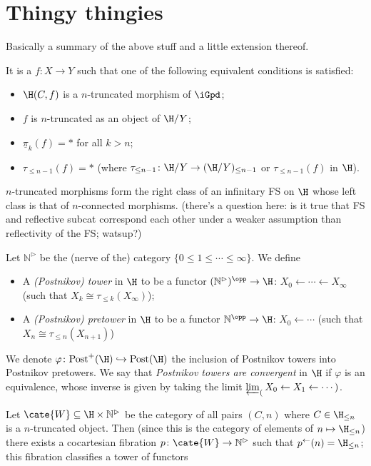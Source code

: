 \section{Thingy thingies}		
Basically a summary of the above stuff and a little extension thereof.		
\begin{definition}		
It is a $f \colon X\to Y$ such that one of the following equivalent conditions is satisfied:		
\begin{itemize}		
	\item $\H(C,f)$ is a $n$-truncated morphism of $\iGpd$;		
	\item $f$ is $n$-truncated as an object of $\H/Y$;		
	\item $\underline{\pi}_k(f) = *$ for all $k>n$;		
	\item $\tau_{\le n-1}(f) = *$ (where $\tau_{\le n-1} \colon \H/Y \to (\H/Y)_{\le n-1}$ or $\tau_{\le n-1}(f)$ in $\H$).		
\end{itemize}		
\end{definition}		
\begin{proposition}		
$n$-truncated morphisms form the right class of an infinitary FS on $\H$ whose left class is that of $n$-connected morphisms. (there's a question here: is it true that FS and reflective subcat correspond each other under a weaker assumption than reflectivity of the FS; watsup?)		
\end{proposition}		
\begin{definition}[Towers]		
Let $\mathbb{N}^\rhd$ be the (nerve of the) category $\{0\le 1\le \cdots \le \infty\}$. We define		
\begin{itemize}		
	\item A \emph{(Postnikov) tower} in $\H$ to be a functor $(\mathbb{N}^\rhd)^\opp \to \H$: $X_0\leftarrow \cdots \leftarrow X_\infty$ (such that $X_k \cong \tau_{\le k}(X_\infty)$);		
	\item A \emph{(Postnikov) pretower} in $\H$ to be a functor $\mathbb{N}^\opp \to \H$: $X_0\leftarrow \cdots$ (such that $X_n\cong \tau_{\le n}(X_{n+1})$)		
\end{itemize}		
We denote $\varphi \colon \text{Post}^+(\H) \hookrightarrow \text{Post}(\H)$ the inclusion of Postnikov towers into Postnikov pretowers. We say that \emph{Postnikov towers are convergent} in $\H$ if $\varphi$ is an equivalence, whose inverse is given by taking the limit $\varprojlim_(X_0\leftarrow X_1\leftarrow \cdots)$.		
\end{definition}		
Let $\cate{W}\subseteq \H \times \mathbb{N}^\rhd$ be the category of all pairs $(C,n)$ where $C\in\H_{\le n}$ is a $n$-truncated object. Then (since this is the category of elements of $n\mapsto \H_{\le n}$) there exists a cocartesian fibration $p \colon \cate{W} \to \mathbb{N}^\rhd$ such that $p^\leftarrow(n) = \H_{\le n}$; this fibration classifies a tower of functors		
